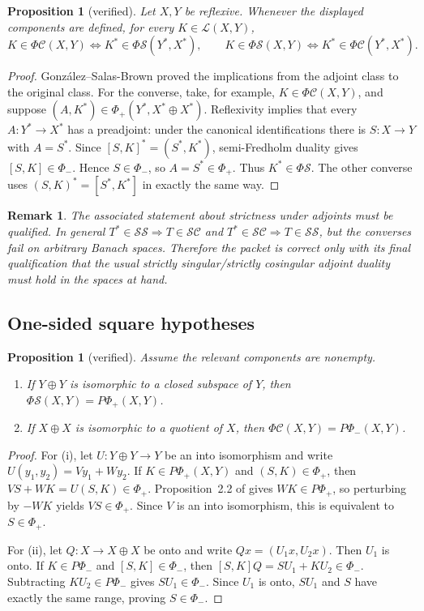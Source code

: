 \documentclass[11pt]{article}
\newtheorem{proposition}[theorem]{Proposition}
\newtheorem{remark}[theorem]{Remark}
\theoremstyle{definition}
\newcommand{\Lop}{\mathcal L}
\newcommand{\SSing}{\mathcal{SS}}
\newcommand{\SCos}{\mathcal{SC}}
\newcommand{\PhiS}{\Phi\mathcal S}
\newcommand{\PhiC}{\Phi\mathcal C}
\newcommand{\PhiP}{\Phi_+}
\newcommand{\PhiM}{\Phi_-}
\newcommand{\PPhiP}{P\Phi_+}
\newcommand{\PPhiM}{P\Phi_-}
\begin{document}
\begin{proposition}[verified]
Let \(X,Y\) be reflexive.  Whenever the displayed components are defined, for every
\(K\in\Lop(X,Y)\),
\[
 K\in\PhiC(X,Y)\iff K^*\in\PhiS(Y^*,X^*),
 \qquad
 K\in\PhiS(X,Y)\iff K^*\in\PhiC(Y^*,X^*).
\]
\end{proposition}

\begin{proof}
Gonz\'alez--Salas-Brown proved the implications from the adjoint class to the original
class.  For the converse, take, for example, \(K\in\PhiC(X,Y)\), and suppose
\((A,K^*)\in\PhiP(Y^*,X^*\oplus X^*)\).  Reflexivity implies that every
\(A\colon Y^*\to X^*\) has a preadjoint: under the canonical identifications there is
\(S\colon X\to Y\) with \(A=S^*\).  Since
\([S,K]^*=(S^*,K^*)\), semi-Fredholm duality gives \([S,K]\in\PhiM\).  Hence
\(S\in\PhiM\), so \(A=S^*\in\PhiP\).  Thus \(K^*\in\PhiS\).  The other converse uses
\((S,K)^*=[S^*,K^*]\) in exactly the same way.
\end{proof}

\begin{remark}
The associated statement about strictness under adjoints must be qualified.  In general
\(T^*\in\SSing\Rightarrow T\in\SCos\) and
\(T^*\in\SCos\Rightarrow T\in\SSing\), but the converses fail on arbitrary Banach
spaces.  Therefore the packet is correct only with its final qualification that the usual
strictly singular/strictly cosingular adjoint duality must hold in the spaces at hand.
\end{remark}

\subsection{One-sided square hypotheses}

\begin{proposition}[verified]
Assume the relevant components are nonempty.
\begin{enumerate}[label=\rm(\roman*)]
\item If \(Y\oplus Y\) is isomorphic to a closed subspace of \(Y\), then
\(\PhiS(X,Y)=\PPhiP(X,Y)\).
\item If \(X\oplus X\) is isomorphic to a quotient of \(X\), then
\(\PhiC(X,Y)=\PPhiM(X,Y)\).
\end{enumerate}
\end{proposition}

\begin{proof}
For (i), let \(U\colon Y\oplus Y\to Y\) be an into isomorphism and write
\(U(y_1,y_2)=Vy_1+Wy_2\).  If \(K\in\PPhiP(X,Y)\) and \((S,K)\in\PhiP\), then
\(VS+WK=U(S,K)\in\PhiP\).  Proposition~2.2 of \cite{GSB2023} gives
\(WK\in\PPhiP\), so perturbing by \(-WK\) yields \(VS\in\PhiP\).  Since \(V\) is an
into isomorphism, this is equivalent to \(S\in\PhiP\).

For (ii), let \(Q\colon X\to X\oplus X\) be onto and write
\(Qx=(U_1x,U_2x)\).  Then \(U_1\) is onto.  If \(K\in\PPhiM\) and
\([S,K]\in\PhiM\), then
\([S,K]Q=SU_1+KU_2\in\PhiM\).  Subtracting \(KU_2\in\PPhiM\) gives
\(SU_1\in\PhiM\).  Since \(U_1\) is onto, \(SU_1\) and \(S\) have exactly the same
range, proving \(S\in\PhiM\).
\end{proof}
\end{document}
